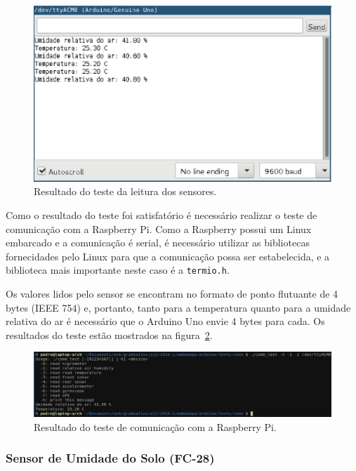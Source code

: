 		\begin{figure}[!htbp]
		\begin{center}
		\includegraphics[width=.7\textwidth]{figuras/am2302_arduino.eps}
		\caption{\label{fig:am2302ardu}Resultado do teste da leitura dos sensores.}
		\end{center}
		\end{figure}

		Como o resultado do teste foi satisfatório é necessário realizar
		o teste de comunicação com a Raspberry Pi. Como a Raspberry possui
		um Linux embarcado e a comunicação é serial, é necessário utilizar
		as bibliotecas fornecidades pelo Linux para que a comunicação
		possa ser estabelecida, e a biblioteca mais importante neste caso
		é a \texttt{termio.h}.
		
		Os valores lidos pelo sensor se encontram no formato de ponto flutuante
		de 4 bytes (IEEE 754) e, portanto, tanto para a temperatura quanto
		para a umidade relativa do ar é necessário que o Arduino Uno envie
		4 bytes para cada. Os resultados do teste estão mostrados na figura~\ref{fig:am2302rasp}.

		\begin{figure}[!htbp]
		\begin{center}
		\includegraphics[width=\textwidth]{figuras/am2302_raspberry.eps}
		\caption{\label{fig:am2302rasp}Resultado do teste de comunicação com a Raspberry Pi.}
		\end{center}
		\end{figure}

  \subsubsection{Sensor de Umidade do Solo (FC-28)}

